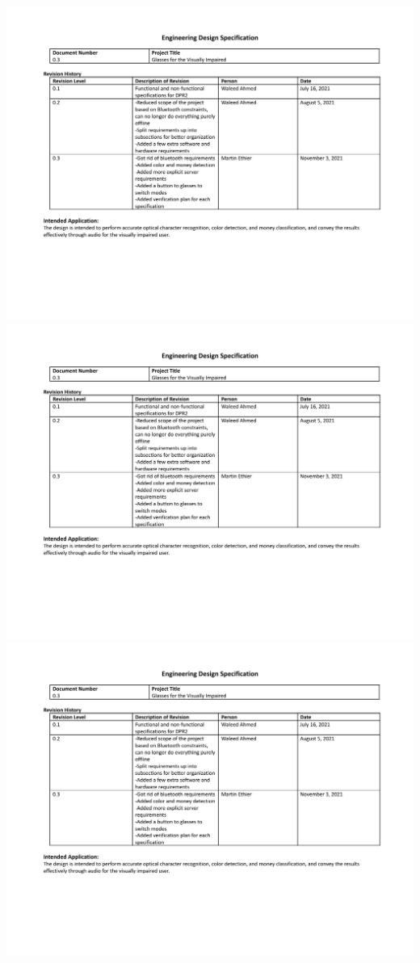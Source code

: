 \documentclass[a4paper,11pt]{article}
\begin{document}
\begin{landscape}
\begin{center}
        \includegraphics[page=3,width={0.86\linewidth}]{pdf/eds_v0.3.pdf}
        \newpage
        \includegraphics[page=4,width={0.86\linewidth}]{pdf/eds_v0.3.pdf}
        \newpage
        \includegraphics[page=5,width={0.86\linewidth}]{pdf/eds_v0.3.pdf}
    \end{center}
\end{landscape}
\end{document}

